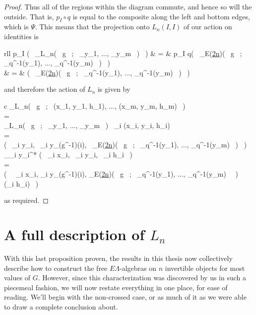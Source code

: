 \documentclass{amsbook} %
\newcommand{\ELnn}{E\Lambda(\underline{2n})}
\newenvironment{eq*}{\begin{equation*}}{\end{equation*}}
\numberwithin{section}{chapter}
\begin{document}
\begin{proof}
Thus all of the regions within the diagram commute, and hence so will the outside. That is, $p_I \circ q$ is equal to the composite along the left and bottom edges, which is $\Psi$. This means that the projection onto $L_n(I,I)$ of our action on identities is
\begin{eq*} \begin{array}{rll}
			p_I \big( \, \alpha_{L_n}( \, g \, ; \, _{y_1}, ..., _{y_m} \, ) \, \big) & = &  p_I q\big( \, \alpha_{\ELnn}( \, g \, ; \, _{q^{-1}(y_1)}, ..., _{q^{-1}(y_m)} \, ) \, \big) \\
			& = & \Psi \big( \, \alpha_{\ELnn}( \, g \, ; \, _{q^{-1}(y_1)}, ..., _{q^{-1}(y_m)} \, ) \, \big)
		\end{array}
\end{eq*}
and therefore the action of $L_n$ is given by
\begin{eq*} \begin{array}{c}
			\alpha_{L_n}\big( \, g \, ; \, (x_1, y_1, h_1), ..., (x_m, y_m, h_m) \, \big) \\
			= \\
			\alpha_{L_n}( \, g \, ; \, _{y_1}, ..., _{y_m} \, ) \circ \, \bigotimes_i (x_i, y_i, h_i) \\
			= \\
			\big( \, \bigotimes_i y_i, \, \bigotimes_i y_{\pi(g^{-1})(i)}, \, \Psi \alpha_{\ELnn}( \, g \, ; \, _{q^{-1}(y_1)}, ..., _{q^{-1}(y_m)} \, ) \, \big) \otimes \, _{\otimes_i y_i}^* \otimes ( \, \bigotimes_i x_i, \, \bigotimes_i y_i, \, \bigotimes_i h_i \, ) \\
			= \\
			\big( \, \, \bigotimes_i x_i, \quad \bigotimes_i y_{\pi(g^{-1})(i)}, \quad \Psi \alpha_{\ELnn}( \, g \, ; \, _{q^{-1}(y_1)}, ..., _{q^{-1}(y_m)} \, \, ) \, \otimes \, (\bigotimes_i h_i) \, \big) 
		\end{array}
\end{eq*}
as required.
\end{proof}

\section{A full description of \texorpdfstring{$L_n$}{L_n}}

With this last proposition proven, the results in this thesis now collectively describe how to construct the free $E\Lambda$-algebras on $n$ invertible objects for most values of $G$. However, since this characterization was discovered by us in such a piecemeal fashion, we will now restate everything in one place, for ease of reading. We'll begin with the non-crossed case, or as much of it as we were able to draw a complete conclusion about.
\end{document}

